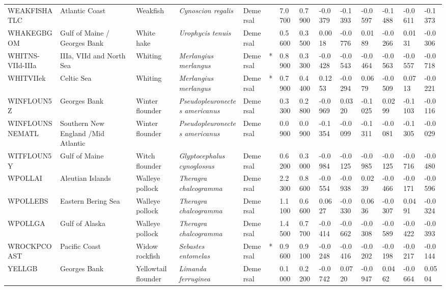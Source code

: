 \begin{longtable}{p{2.8cm}p{2cm}p{1.7cm}p{1.7cm}p{1cm}p{0.3cm}p{1cm}p{1cm}p{1cm}p{1cm}p{1cm}p{1cm}p{1cm}p{1cm}}
  WEAKFISHATLC & Atlantic Coast & Weakfish & \textit{Cynoscion regalis} & Demersal &   & 7.0700 & 0.7900 & -0.0379 & -0.1393 & -0.0597 & -0.1488 & -0.0611 & -0.1373 \\ 
  WHAKEGBGOM & Gulf of Maine / Georges Bank & White hake & \textit{Urophycis tenuis} & Demersal &   & 0.5600 & 0.3500 & 0.0018 & -0.0776 & 0.0189 & -0.0266 & 0.0131 & -0.0306 \\ 
  WHITNS-VIId-IIIa & IIIa, VIId and North Sea & Whiting & \textit{Merlangius merlangus} & Demersal & * & 0.8900 & 0.3300 & -0.0428 & -0.0543 & -0.0464 & -0.0563 & -0.0557 & -0.0718 \\ 
  WHITVIIek & Celtic Sea & Whiting & \textit{Merlangius merlangus} & Demersal & * & 0.7900 & 0.4400 & 0.1253 & -0.0294 & 0.0679 & -0.0509 & 0.0713 & -0.0221 \\ 
  WINFLOUN5Z & Georges Bank & Winter flounder & \textit{Pseudopleuronectes americanus} & Demersal &   & 0.3300 & 0.2800 & -0.0969 & 0.0320 & -0.1025 & 0.0299 & -0.1103 & -0.0116 \\ 
  WINFLOUNSNEMATL & Southern New England /Mid Atlantic & Winter flounder & \textit{Pseudopleuronectes americanus} & Demersal &   & 0.0900 & 0.0900 & -0.1354 & -0.0099 & -0.1311 & -0.0081 & -0.1305 & -0.0029 \\ 
  WITFLOUN5Y & Gulf of Maine & Witch flounder & \textit{Glyptocephalus cynoglossus} & Demersal &   & 0.6200 & 0.3000 & -0.0984 & -0.0125 & -0.0985 & -0.0125 & -0.0716 & -0.0480 \\ 
  WPOLLAI & Aleutian Islands & Walleye pollock & \textit{Theragra chalcogramma} & Demersal &   & 2.2300 & 0.8600 & -0.0554 & -0.0938 & 0.0239 & -0.0466 & -0.0171 & -0.0596 \\ 
  WPOLLEBS & Eastern Bering Sea & Walleye pollock & \textit{Theragra chalcogramma} & Demersal &   & 1.1100 & 0.6600 & 0.0627 & -0.0330 & 0.0636 & -0.0307 & 0.0491 & -0.0324 \\ 
  WPOLLGA & Gulf of Alaska & Walleye pollock & \textit{Theragra chalcogramma} & Demersal &   & 1.4500 & 0.7700 & -0.0414 & -0.0662 & -0.0308 & -0.0589 & -0.0422 & -0.0393 \\ 
  WROCKPCOAST & Pacific Coast & Widow rockfish & \textit{Sebastes entomelas} & Demersal & * & 0.9600 & 0.9100 & -0.0248 & -0.0416 & -0.0202 & -0.0198 & -0.0217 & -0.0144 \\ 
  YELLGB & Georges Bank & Yellowtail flounder & \textit{Limanda ferruginea} & Demersal &   & 0.1000 & 0.2200 & -0.0742 & 0.0720 & -0.0947 & 0.0462 & -0.0664 & 0.0504 \\ 

\end{longtable}
